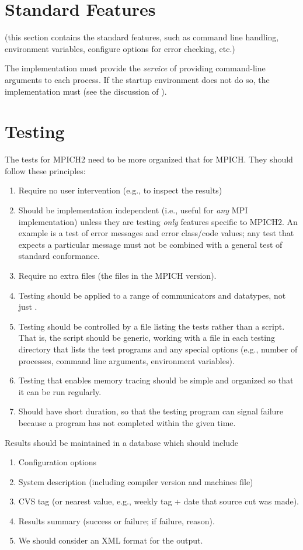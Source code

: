\documentclass{article}
\begin{document}
\section{Standard Features}
(this section contains the standard features, such as command line
handling, environment variables, configure options for error checking,
etc.)

The implementation must provide the \emph{service} of providing
command-line arguments to each process.  If the startup environment
does not do so, the implementation must (see the discussion of
).  

\section{Testing}

The tests for MPICH2 need to be more organized that for MPICH. They
should follow these principles:
\begin{enumerate}
\item Require no user intervention (e.g., to inspect the results)
\item Should be implementation independent (i.e., useful for
\emph{any} MPI implementation) unless they are testing \emph{only}
features specific to MPICH2.  An example is a test of error messages
and error class/code values; any test that expects a particular
message must not be combined with a general test of standard
conformance.
\item Require no extra files (the  files in the MPICH
version).
\item Testing should be applied to a range of communicators and
datatypes, not just .  
\item Testing should be controlled by a file listing the tests rather
than a script.  That is, the script  should be generic,
working with a file in each testing directory that lists the test
programs and any special options (e.g., number of processes, command
line arguments, environment variables).
\item Testing that enables memory tracing should be simple and
organized so that it can be run regularly.
\item Should have short duration, so that the testing program can
signal failure because a program has not completed within the given
time.
\end{enumerate}

Results should be maintained in a database which should include
\begin{enumerate}
\item Configuration options
\item System description (including compiler version and machines file)
\item CVS tag (or nearest value, e.g., weekly tag + date that source
cut was made).
\item Results summary (success or failure; if failure, reason).
\item We should consider an XML format for the output.
\end{enumerate}
\end{document}
